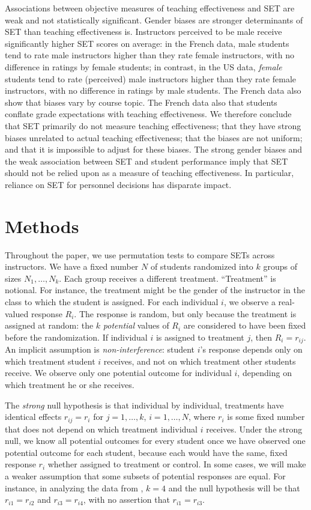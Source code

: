 \documentclass[12pt]{article}
\begin{document}
Associations between objective measures of teaching effectiveness and SET are weak
and not statistically significant.
Gender biases are stronger determinants of SET than teaching effectiveness is.
Instructors perceived to be male receive significantly higher SET scores on average:
in the French data, male students tend to rate male instructors higher
than they rate female instructors, with no difference in ratings by female students;
in contrast, in the US data, \emph{female} students tend to rate (perceived) male instructors 
higher than they rate female instructors, with no difference in ratings by male students. 
The French data also show that biases vary by course topic. 
The French data also that students conflate grade expectations with teaching effectiveness.
We therefore conclude that SET primarily do not measure teaching effectiveness; that
they have strong biases unrelated to actual teaching effectiveness; that the biases are not uniform;
and that it is impossible to adjust for these biases. 
The strong gender biases and the weak association between SET and student performance
imply that SET should not be relied upon as a measure of teaching effectiveness.
In particular, reliance on SET for personnel decisions has disparate impact. 

\section{Methods}
Throughout the paper, we use permutation tests to compare SETs across instructors. 
We  have a fixed number $N$ of students randomized into $k$ groups of sizes $N_1, \ldots, N_k$.
Each group receives a different treatment.
``Treatment'' is notional. For instance, the treatment might be the gender of the
instructor in the class to which the student is assigned.
For each individual $i$, we observe a real-valued response $R_i$.
The response is random, but only because the treatment is assigned at random:
the $k$ \emph{potential} values of $R_i$ are considered to have been fixed before the randomization.
If individual $i$ is assigned to treatment $j$, then $R_i = r_{ij}$.
An implicit assumption is \emph{non-interference}: student $i$'s response depends only on
which treatment student $i$ receives, and not on which treatment other students receive.
We observe only one potential outcome for individual $i$, depending on which treatment
he or she receives.

The \emph{strong} null hypothesis is that individual by individual, treatments have identical effects
$r_{ij} = r_i$ for $j = 1, \ldots, k$, $i = 1, \ldots, N$, where $r_i$ is some fixed number that does
not depend on which treatment individual $i$ receives.
Under the strong null, we know all potential outcomes for every student once we have observed
one potential outcome for each student, because each would have the same, fixed response $r_i$
whether assigned to treatment or control.  
In some cases, we will make a weaker assumption that some subsets of potential responses are equal.
For instance, in analyzing the data from \citet{MacNell2014}, $k=4$ and the null hypothesis
will be that $r_{i1} = r_{i2}$ and $r_{i3} = r_{i4}$, with no assertion that $r_{i1}=r_{i3}$.\\
\end{document}
